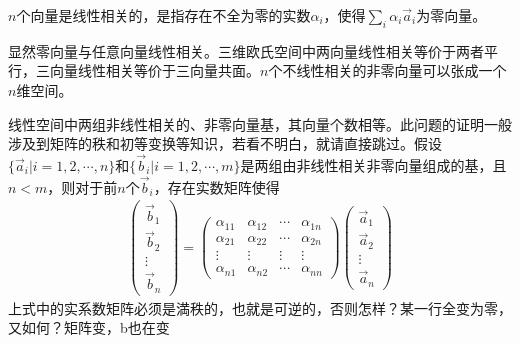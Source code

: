 \begin{example}
  $n$个向量是线性相关的，是指存在不全为零的实数$\alpha_i$，使得$\sum_i\alpha_i\vec a_i$为零向量。

  显然零向量与任意向量线性相关。三维欧氏空间中两向量线性相关等价于两者平行，三向量线性相关等价于三向量共面。$n$个不线性相关的非零向量可以张成一个$n$维空间。

  线性空间中两组非线性相关的、非零向量基，其向量个数相等。此问题的证明一般涉及到矩阵的秩和初等变换等知识，若看不明白，就请直接跳过。假设$\{\vec a_i|i=1,2,\cdots,n\}$和$\{\vec b_i|i=1,2,\cdots,m\}$是两组由非线性相关非零向量组成的基，且$n<m$，则对于前$n$个$\vec b_i$，存在实数矩阵使得
  \begin{align*}
    \begin{pmatrix}\vec b_1 \\ \vec b_2 \\ \vdots \\ \vec b_n\end{pmatrix}=
    \begin{pmatrix}
      \alpha_{11} & \alpha_{12} & \cdots & \alpha_{1n}\\
      \alpha_{21} & \alpha_{22} & \cdots & \alpha_{2n}\\
      \vdots      & \vdots      & \vdots & \vdots     \\
      \alpha_{n1} & \alpha_{n2} & \cdots & \alpha_{nn}
    \end{pmatrix}
    \begin{pmatrix}\vec a_1 \\ \vec a_2 \\ \vdots \\ \vec a_n\end{pmatrix}
  \end{align*}
  上式中的实系数矩阵必须是満秩的，也就是可逆的，否则{\color{red}怎样？某一行全变为零，又如何？矩阵变，b也在变}


\end{example}
